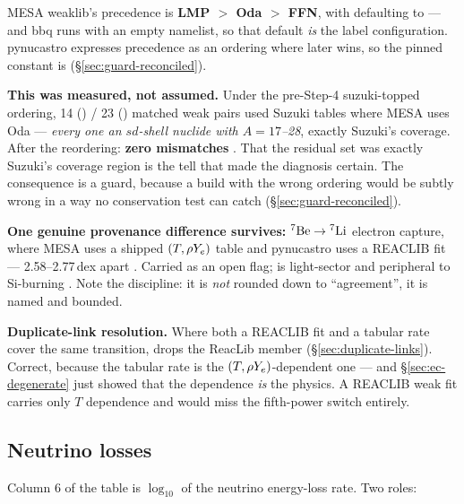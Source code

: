 MESA weaklib's precedence is \textbf{LMP $>$ Oda $>$ FFN}, with
 defaulting to  --- and bbq runs with
an empty  namelist, so that default \emph{is} the label
configuration. pynucastro expresses precedence as an ordering where later wins,
so the pinned constant is 
(\S\ref{sec:guard-reconciled}).

\textbf{This was measured, not assumed.} Under the pre-Step-4 suzuki-topped
ordering, 14 () / 23 () matched weak pairs used Suzuki tables
where MESA uses Oda --- \emph{every one an $sd$-shell nuclide with
$A = 17$--28}, exactly Suzuki's coverage. After the reordering: \textbf{zero
mismatches} . That the residual set was exactly Suzuki's
coverage region is the tell that made the diagnosis certain. The consequence is
a guard, because a build with the wrong ordering would be subtly wrong in a way
no conservation test can catch (\S\ref{sec:guard-reconciled}).

\textbf{One genuine provenance difference survives:}
$\nuc{Be}{7} \to \nuc{Li}{7}$ electron capture, where MESA uses a shipped
 $(T, \rhoye)$ table and pynucastro uses a REACLIB
 fit --- 2.58--2.77\,dex apart . Carried as an
open flag;  is light-sector and peripheral to Si-burning \Ye. Note
the discipline: it is \emph{not} rounded down to ``agreement'', it is named and
bounded.

\textbf{Duplicate-link resolution.} Where both a REACLIB fit and a tabular rate
cover the same transition,  drops the ReacLib member
(\S\ref{sec:duplicate-links}). Correct, because the tabular rate is the
$(T, \rhoye)$-dependent one --- and \S\ref{sec:ec-degenerate} just showed that
the \rhoye{} dependence \emph{is} the physics. A REACLIB weak fit carries only
$T$ dependence and would miss the fifth-power \muE{} switch entirely.

\subsection{Neutrino losses}
\label{sec:nulosses}

Column 6 of the table is $\log_{10}$ of the neutrino energy-loss rate. Two
roles:

